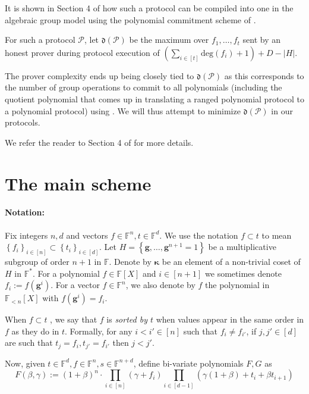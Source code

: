 \documentclass[11pt]{article} %
\newcommand{\F}{\ensuremath{\mathbb F}\xspace}
\renewcommand{\deg}{\ensuremath{\mathrm{deg}}\xspace}
\newcommand{\defeq}{:=}
\newcommand{\dom}{\ensuremath{H}\xspace}
\newcommand{\sett}[2]{\ensuremath{\set{#1}_{#2}}\xspace}
\newcommand{\set}[1]{\ensuremath{\left\{#1\right\}}\xspace}
\newcommand{\hgen}{\ensuremath{\mathbf{g}}\xspace}
\newcommand{\cosetgen}{\ensuremath{\mathbf{\kappa}}\xspace}
\newcommand{\polysofdeg}[1]{\ensuremath{\F_{< #1}[X]}\xspace}
\newcommand{\polyss}{\ensuremath{\F[X]}\xspace}
\newcommand{\prot}{\ensuremath{\mathscr{P}}\xspace}
\newcommand{\aggdeg}[1]{\ensuremath{\mathfrak{d}(#1)}\xspace}
\begin{document}
It is shown in Section 4 of \cite{plonk} how such a protocol can be compiled into one in the algebraic group model using the polynomial commitment scheme of \cite{kate}.


For such a protocol \prot, let $\aggdeg{\prot}$ be the maximum over $f_1,\ldots,f_t$ sent by an honest prover during protocol execution of $\left(\sum_{i\in [t]} \deg(f_i)+1\right)+D-|H|$.

The prover complexity ends up being closely tied to \aggdeg{\prot} as this corresponds to the number of group operations to commit to all polynomials (including the quotient polynomial that comes up in translating a ranged polynomial protocol to a polynomial protocol) using \cite{kate}. We will thus attempt to minimize \aggdeg{\prot} in our protocols.


We refer the reader to Section 4 of \cite{plonk} for more details.
 

\section{The main scheme}\label{sec:mainscheme}


\paragraph{Notation:}

Fix integers $n,d$ and vectors $f\in \F^n, t\in\F^d$.
We use the notation $f\subset t$ to mean $\sett{f_i}{i\in [n]}\subset \sett{t_i}{i\in [d]}$. Let $\dom=\set{\hgen,\ldots,\hgen^{n+1}=1}$ be a multiplicative subgroup of order $n+1$ in \F.  Denote by $\cosetgen$ be an element of a non-trivial coset of $H$ in $\F^*$.
For a polynomial $f\in \polyss$ and $i\in [n+1]$ we sometimes denote $f_i\defeq f(\hgen^i)$.
For a vector $f\in \F^n$, we also denote by $f$ the polynomial in \polysofdeg{n} with $f(\hgen^i) =f_i$.


When $f\subset t$ , we say that $f$ is \emph{sorted by $t$} when values appear in the same order in $f$ as they do in $t$. Formally, for any $i<i'\in [n]$ such that $f_i\neq f_{i'}$, if $j,j'\in [d]$ are such that $t_{j} = f_i, t_{j'} =f_{i'}$ then $j<j'$.

Now, given $t\in \F^d, f\in \F^n, s\in \F^{n+d}$, define bi-variate polynomials $F,G$ as 
\[F(\beta,\gamma) \defeq (1+\beta)^n\cdot \prod_{i\in [n]} (\gamma + f_i) \prod_{i\in [d-1]} (\gamma(1+\beta) + t_i + \beta t_{i+1})\]
                                  
\end{document}
